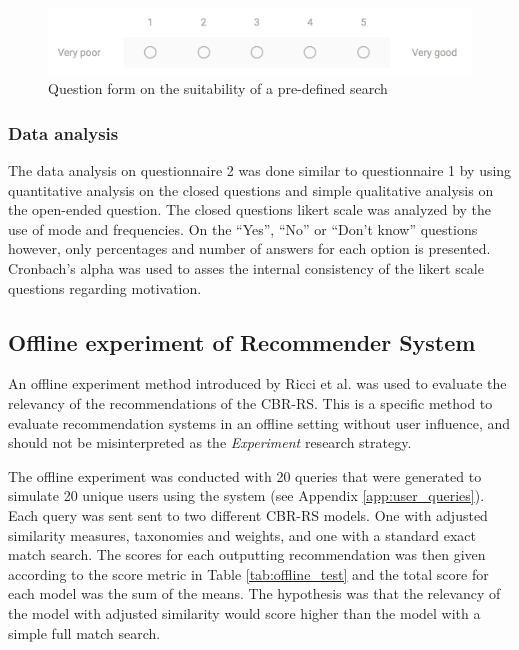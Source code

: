 \begin{figure}[H]
    \centering
    \includegraphics[width=1\textwidth]{fig/rate_search.png}
    \caption{Question form on the suitability of a pre-defined search}
    \label{fig:q2_rate_search}
\end{figure}


\subsubsection{Data analysis}
The data analysis on questionnaire 2 was done similar to questionnaire 1 by using quantitative analysis on the closed questions and simple qualitative analysis on the open-ended question. The closed questions likert scale was analyzed by the use of mode and frequencies. On the \enquote{Yes}, \enquote{No} or \enquote{Don't know} questions however, only percentages and number of answers for each option is presented. Cronbach's alpha was used to asses the internal consistency of the likert scale questions regarding motivation. 

\subsection{Offline experiment of Recommender System}\label{sec:observation_test}
An offline experiment method introduced by Ricci et al. \cite{ricci2011introduction} was used to evaluate the relevancy of the recommendations of the CBR-RS. This is a specific method to evaluate recommendation systems in an offline setting without user influence, and should not be misinterpreted as the \textit{Experiment} research strategy.

The offline experiment was conducted with 20 queries that were generated to simulate 20 unique users using the system (see Appendix \ref{app:user_queries}). Each query was sent sent to two different CBR-RS models. One with adjusted similarity measures, taxonomies and weights, and one with a standard exact match search. The scores for each outputting recommendation was then given according to the score metric in Table \ref{tab:offline_test} and the total score for each model was the sum of the means. The hypothesis was that the relevancy of the model with adjusted similarity would score higher than the model with a simple full match search. 


